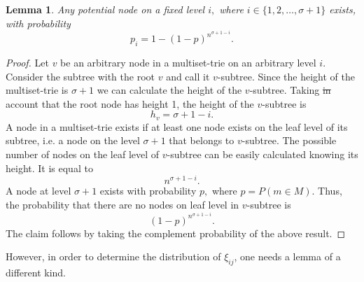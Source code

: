 \documentclass[10pt,letterpaper]{article}
\newtheorem{lemma}{Lemma}
\providecommand{\DIFaddtex}[1]{{\protect\color{blue}\uwave{#1}}} %
\providecommand{\DIFdeltex}[1]{{\protect\color{red}\sout{#1}}}                      %
\providecommand{\DIFaddbegin}{} %
\providecommand{\DIFaddend}{} %
\providecommand{\DIFdelbegin}{} %
\providecommand{\DIFdelend}{} %
\providecommand{\DIFadd}[1]{\texorpdfstring{\DIFaddtex{#1}}{#1}} %
\providecommand{\DIFdel}[1]{\texorpdfstring{\DIFdeltex{#1}}{}} %
\newcommand{\DIFscaledelfig}{0.5}
\newlength{\DIFdelgraphicswidth} %
\newlength{\DIFdelgraphicsheight} %
\newcommand{\DIFaddincludegraphics}[2][]{{\color{blue}\fbox{\DIFOincludegraphics[#1]{#2}}}} %
\newcommand{\DIFdelincludegraphics}[2][]{%
\sbox{\DIFdelgraphicsbox}{\DIFOincludegraphics[#1]{#2}}%
\settoboxwidth{\DIFdelgraphicswidth}{\DIFdelgraphicsbox} %
\settoboxtotalheight{\DIFdelgraphicsheight}{\DIFdelgraphicsbox} %
\scalebox{\DIFscaledelfig}{%
\parbox[b]{\DIFdelgraphicswidth}{\usebox{\DIFdelgraphicsbox}\\[-\baselineskip] \rule{\DIFdelgraphicswidth}{0em}}\llap{\resizebox{\DIFdelgraphicswidth}{\DIFdelgraphicsheight}{%
\setlength{\unitlength}{\DIFdelgraphicswidth}%
\begin{picture}(1,1)%
\thicklines\linethickness{2pt} %
{\color[rgb]{1,0,0}\put(0,0){\framebox(1,1){}}}%
{\color[rgb]{1,0,0}\put(0,0){\line( 1,1){1}}}%
{\color[rgb]{1,0,0}\put(0,1){\line(1,-1){1}}}%
\end{picture}%
}\hspace*{3pt}}} %
} %
\DeclareRobustCommand{\DIFaddbegin}{\DIFOaddbegin \let\includegraphics\DIFaddincludegraphics} %
\DeclareRobustCommand{\DIFaddend}{\DIFOaddend \let\includegraphics\DIFOincludegraphics} %
\DeclareRobustCommand{\DIFdelbegin}{\DIFOdelbegin \let\includegraphics\DIFdelincludegraphics} %
\DeclareRobustCommand{\DIFdelend}{\DIFOaddend \let\includegraphics\DIFOincludegraphics} %
\begin{document}
\begin{lemma}\label{l:prob-node-existence}
Any potential node on a fixed level $i,$ where $i\in \{ 1,2,\ldots, \sigma +1 \}$ exists, %
with probability
\begin{equation}
p_i=1-(1-p)^{n^{\sigma + 1 -i}}.
\end{equation}
\end{lemma}
\begin{proof}
Let $v$ be an arbitrary node in a multiset-trie on an arbitrary level $i.$ Consider
the subtree with the root $v$ and call it $v$-subtree. Since the height of the
multiset-trie is $\sigma + 1$ we can calculate the height of the $v$-subtree.
Taking \DIFdelbegin \DIFdel{in }\DIFdelend \DIFaddbegin \DIFadd{into }\DIFaddend account that the root node has height 1, the height of the $v$-subtree is
%
\[
h_v = \sigma + 1 - i.
\]
%
A node in a multiset-trie exists if at least one node exists on the leaf level of its
subtree, i.e. a node on the level $\sigma + 1$ that belongs to $v$-subtree. The possible
number of nodes on the leaf level of $v$-subtree can be easily calculated knowing its height.
It is equal to
%
\[
n^{\sigma + 1 - i}.
\]
%
A node at level $\sigma+1$ exists with probability $p,$ where $p = P(m\in M).$
Thus, the probability that there are no nodes on leaf level in $v$-subtree is
%
\[
(1-p)^{n^{\sigma +1 - i}}.
\]
%
The claim follows by taking the complement probability of the above result. 

%
\end{proof}

However, in order to determine the distribution of $\xi_{ij}$, one needs a lemma of a different kind.
\end{document}
